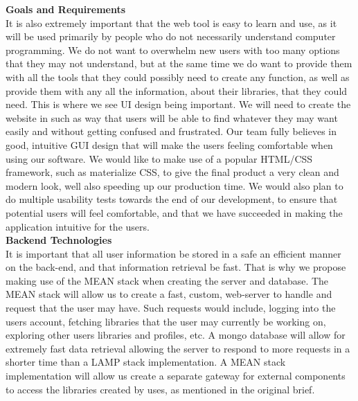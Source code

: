 \documentclass[12pt]{article}
\begin{document}
	\textbf{Goals and Requirements}\\
    It is also extremely important that the web tool is easy to learn and use, as it will be used primarily by people who do not necessarily
    understand computer programming. We do not want to overwhelm new users with too many options that they may not understand, but at the 
    same time we do want to provide them with all the tools that they could possibly need to create any function, as well as provide them 
    with any all the information, about their libraries, that they could need. This is where we see UI design being important. We will need 
    to create the website in such as way that users will be able to find whatever they may want easily and without getting confused and 
    frustrated. Our team fully believes in good, intuitive GUI design that will make the users feeling comfortable when using our software.
    We would like to make use of a popular HTML/CSS framework, such as materialize CSS, to give the final product a very clean and modern look,
    well also speeding up our production time. We would also plan to do multiple usability tests towards the end of our development, to ensure
    that potential users will feel comfortable, and that we have succeeded in making the application intuitive for the users. \\

	\textbf{Backend Technologies}\\
    It is important that all user information be stored in a safe an efficient manner on the back-end, and that information retrieval be fast. 
    That is why we propose making use of the MEAN stack when creating the server and database. The MEAN stack will allow us to create a fast, 
    custom, web-server to handle and request that the user may have. Such requests would include, logging into the users account, fetching 
    libraries that the user may currently be working on, exploring other users libraries and profiles, etc. A mongo database will allow for 
    extremely fast data retrieval allowing the server to respond to more requests in a shorter time than a LAMP stack implementation. A MEAN 
    stack implementation will allow us create a separate gateway for external components to access the libraries created by uses, as mentioned
    in the original brief.\\
\end{document}
